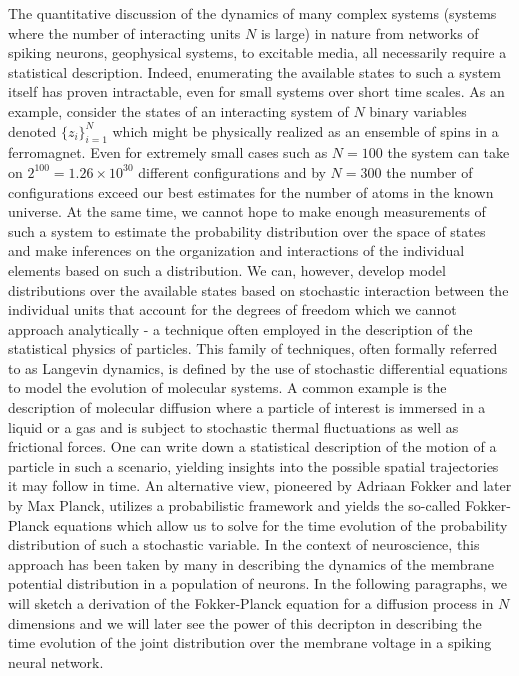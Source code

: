 \documentclass{ucetd}
\begin{document}
The quantitative discussion of the dynamics of many complex systems (systems where the number of interacting units $N$ is large) in nature from networks of spiking neurons, geophysical systems, to excitable media, all necessarily require a statistical description. Indeed, enumerating the available states to such a system itself has proven intractable, even for small systems over short time scales. As an example, consider the states of an interacting system of $N$ binary variables denoted $\{z_{i}\}_{i=1}^{N}$ which might be physically realized as an ensemble of spins in a ferromagnet. Even for extremely small cases such as $N=100$ the system can take on $2^{100} = 1.26\times 10^{30}$ different configurations and by $N=300$ the number of configurations exceed our best estimates for the number of atoms in the known universe. At the same time, we cannot hope to make enough measurements of such a system to estimate the probability distribution over the space of states and make inferences on the organization and interactions of the individual elements based on such a distribution. We can, however, develop model distributions over the available states based on stochastic interaction between the individual units that account for the degrees of freedom which we cannot approach analytically - a technique often employed in the description of the statistical physics of particles. This family of techniques, often formally referred to as Langevin dynamics, is defined by the use of stochastic differential equations to model the evolution of molecular systems. A common example is the description of molecular diffusion where a particle of interest is immersed in a liquid or a gas and is subject to stochastic thermal fluctuations as well as frictional forces. One can write down a statistical description of the  motion of a particle in such a scenario, yielding insights into the possible spatial trajectories it may follow in time. An alternative view, pioneered by Adriaan Fokker and later by Max Planck, utilizes a probabilistic framework and yields the so-called Fokker-Planck equations which allow us to solve for the time evolution of the probability distribution of such a stochastic variable. In the context of neuroscience, this approach has been taken by many in describing the dynamics of the membrane potential distribution in a population of neurons. In the following paragraphs, we will sketch a derivation of the Fokker-Planck equation for a diffusion process in $N$ dimensions and we will later see the power of this decripton in describing the time evolution of the joint distribution over the membrane voltage in a spiking neural network.
\end{document}
